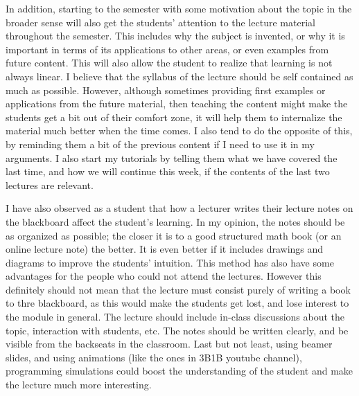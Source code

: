 \documentclass{article}
\begin{document}
\vspace{5mm}

\par In addition, starting to the semester with some motivation about the topic in the broader sense will also get the students' attention to the lecture material throughout the semester. This includes why the subject is invented, or why it is important in terms of its applications to other areas, or even examples from future content. This will also allow the student to realize that learning is not always linear. I believe that the syllabus of the lecture should be self contained as much as possible. However, although sometimes providing first examples or applications from the future material, then teaching the content might make the students get a bit out of their comfort zone, it will help them to internalize the material much better when the time comes. I also tend to do the opposite of this, by reminding them a bit of the previous content if I need to use it in my arguments. I also start my tutorials by telling them what we have covered the last time, and how we will continue this week, if the contents of the last two lectures are relevant.

\vspace{5mm}

\par I have also observed as a student that how a lecturer writes their lecture notes on the blackboard affect the student's learning. In my opinion, the notes should be as organized as possible; the closer it is to a good structured math book (or an online lecture note) the better. It is even better if it includes drawings and diagrams to improve the students' intuition. This method has also have some advantages for the people who could not attend the lectures. However this definitely should not mean that the lecture must consist purely of writing a book to thre blackboard, as this would make the students get lost, and lose interest to the module in general. The lecture should include in-class discussions about the topic, interaction with students, etc. The notes should be written clearly, and be visible from the backseats in the classroom. Last but not least, using beamer slides, and using animations (like the ones in 3B1B youtube channel), programming simulations could boost the understanding of the student and make the lecture much more interesting.

\vspace{5mm}
\end{document}
